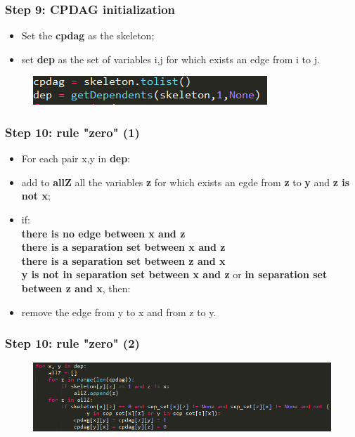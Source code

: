 \documentclass[xcolor ={table,usenames,dvipsnames}]{beamer}
\theoremstyle{definition}
\begin{document}
\begin{frame}
\frametitle{Step 9: CPDAG initialization}
\begin{itemize}
	\item Set the \textbf{cpdag} as the skeleton;
	\item set \textbf{dep} as the set of variables i,j for which exists an edge from i to j.
\end{itemize}
	\begin{figure}[h!]
		\centering
		\includegraphics[scale=0.8]{img/cpdaginit.PNG}
		\label{Interfacce di un CS}
	\end{figure}
\end{frame}
\begin{frame}
\frametitle{Step 10: rule "zero" (1)}
\begin{itemize}
	\item For each pair x,y in \textbf{dep}:
	\item add to \textbf{allZ} all the variables \textbf{z} for which exists an egde from \textbf{z} to \textbf{y} and \textbf{z is not x};
	\item if:\\\textbf{there is no edge between x and z}\\ \textbf{there is a separation set between x and z}\\\textbf{there is a separation set between z and x}\\\textbf{y is not in separation set between x and z} or \textbf{in separation set between z and x}, then:
	\item remove the edge from y to x and from z to y.
\end{itemize}
\end{frame}
\begin{frame}
\frametitle{Step 10: rule "zero" (2)}
	\begin{figure}[h!]
		\centering
		\includegraphics[scale=0.52]{img/rulezero.PNG}
	\end{figure}
\end{frame}
\end{document}
